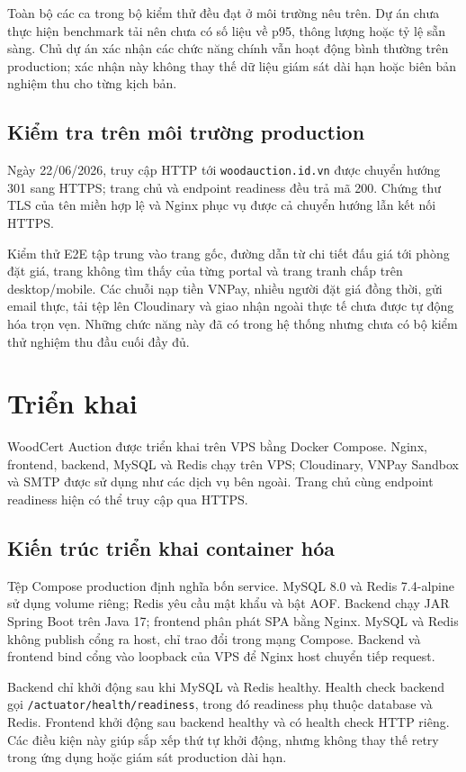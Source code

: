 \documentclass[../DoAn.tex]{subfiles}
\begin{document}
\FloatBarrier
Toàn bộ các ca trong bộ kiểm thử đều đạt ở môi trường nêu trên. Dự án chưa thực hiện benchmark tải nên chưa có số liệu về p95, thông lượng hoặc tỷ lệ sẵn sàng. Chủ dự án xác nhận các chức năng chính vẫn hoạt động bình thường trên production; xác nhận này không thay thế dữ liệu giám sát dài hạn hoặc biên bản nghiệm thu cho từng kịch bản.

\subsection{Kiểm tra trên môi trường production}

Ngày 22/06/2026, truy cập HTTP tới \texttt{woodauction.id.vn} được chuyển hướng 301 sang HTTPS; trang chủ và endpoint readiness đều trả mã 200. Chứng thư TLS của tên miền hợp lệ và Nginx phục vụ được cả chuyển hướng lẫn kết nối HTTPS.

Kiểm thử E2E tập trung vào trang gốc, đường dẫn từ chi tiết đấu giá tới phòng đặt giá, trang không tìm thấy của từng portal và trang tranh chấp trên desktop/mobile. Các chuỗi nạp tiền VNPay, nhiều người đặt giá đồng thời, gửi email thực, tải tệp lên Cloudinary và giao nhận ngoài thực tế chưa được tự động hóa trọn vẹn. Những chức năng này đã có trong hệ thống nhưng chưa có bộ kiểm thử nghiệm thu đầu cuối đầy đủ.

\FloatBarrier
\section{Triển khai}

WoodCert Auction được triển khai trên VPS bằng Docker Compose. Nginx, frontend, backend, MySQL và Redis chạy trên VPS; Cloudinary, VNPay Sandbox và SMTP được sử dụng như các dịch vụ bên ngoài. Trang chủ cùng endpoint readiness hiện có thể truy cập qua HTTPS.

\subsection{Kiến trúc triển khai container hóa}

Tệp Compose production định nghĩa bốn service. MySQL 8.0 và Redis 7.4-alpine sử dụng volume riêng; Redis yêu cầu mật khẩu và bật AOF. Backend chạy JAR Spring Boot trên Java 17; frontend phân phát SPA bằng Nginx. MySQL và Redis không publish cổng ra host, chỉ trao đổi trong mạng Compose. Backend và frontend bind cổng vào loopback của VPS để Nginx host chuyển tiếp request.

Backend chỉ khởi động sau khi MySQL và Redis healthy. Health check backend gọi \texttt{/actuator/health/readiness}, trong đó readiness phụ thuộc database và Redis. Frontend khởi động sau backend healthy và có health check HTTP riêng. Các điều kiện này giúp sắp xếp thứ tự khởi động, nhưng không thay thế retry trong ứng dụng hoặc giám sát production dài hạn.
\end{document}
